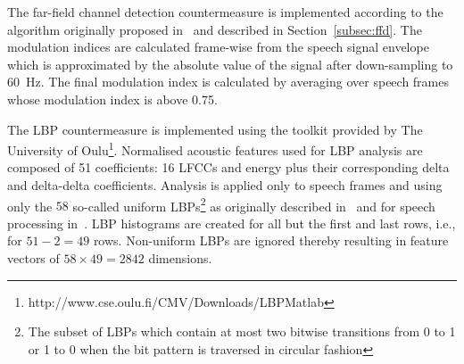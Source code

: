 
The far-field channel detection countermeasure is implemented according to the algorithm originally proposed in~\cite{Villalba2011} and described in Section~\ref{subsec:ffd}. The modulation indices are calculated frame-wise from the speech signal envelope which is approximated by the absolute value of the signal after down-sampling to 60~Hz.  The final modulation index is calculated by averaging over speech frames whose modulation index is above 0.75.  


The LBP countermeasure is implemented using the toolkit provided by The University of Oulu\footnote{http://www.cse.oulu.fi/CMV/Downloads/LBPMatlab}.
Normalised acoustic features used for LBP analysis are composed of 51 coefficients: 16 LFCCs and energy plus their corresponding delta and delta-delta coefficients.  Analysis is applied only to speech frames and using only the $58$ so-called uniform LBPs\footnote{The subset of LBPs which contain at most two bitwise transitions from 0 to 1 or 1 to 0 when the bit pattern is traversed in circular fashion} as originally described in~\cite{Ojala2002} and for speech processing in~\cite{Alegre2013a}.  %
LBP histograms are created for all but the first and last rows, i.e., for $51 - 2 = 49$ rows.  Non-uniform LBPs are ignored thereby resulting in feature vectors of $58 \times 49 = 2842$ dimensions. 

